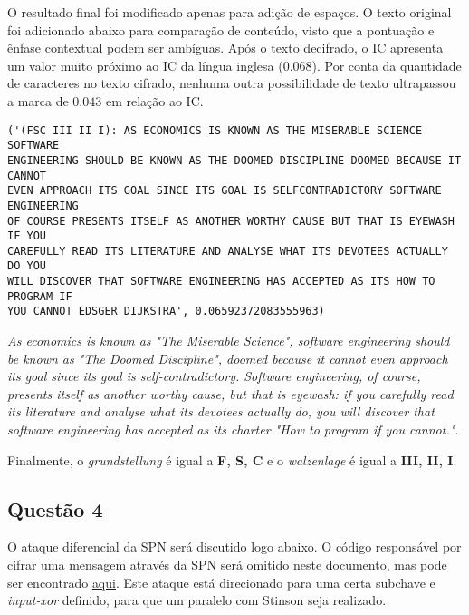 \documentclass{article}
\begin{document}
O resultado final foi modificado apenas para adição de espaços. O texto
original foi adicionado abaixo para comparação de conteúdo, visto que a
pontuação e ênfase contextual podem ser ambíguas. Após o texto decifrado, o IC
apresenta um valor muito próximo ao IC da língua inglesa ($0.068$). Por conta
da quantidade de caracteres no texto cifrado, nenhuma outra possibilidade de
texto ultrapassou a marca de $0.043$ em relação ao IC.

\begin{verbatim}
('(FSC III II I): AS ECONOMICS IS KNOWN AS THE MISERABLE SCIENCE SOFTWARE
ENGINEERING SHOULD BE KNOWN AS THE DOOMED DISCIPLINE DOOMED BECAUSE IT CANNOT
EVEN APPROACH ITS GOAL SINCE ITS GOAL IS SELFCONTRADICTORY SOFTWARE ENGINEERING
OF COURSE PRESENTS ITSELF AS ANOTHER WORTHY CAUSE BUT THAT IS EYEWASH IF YOU
CAREFULLY READ ITS LITERATURE AND ANALYSE WHAT ITS DEVOTEES ACTUALLY DO YOU
WILL DISCOVER THAT SOFTWARE ENGINEERING HAS ACCEPTED AS ITS HOW TO PROGRAM IF
YOU CANNOT EDSGER DIJKSTRA', 0.06592372083555963)
\end{verbatim}

\textit{As economics is known as "The Miserable Science", software engineering
should be known as "The Doomed Discipline", doomed because it cannot even
approach its goal since its goal is self-contradictory. Software engineering,
of course, presents itself as another worthy cause, but that is eyewash: if
you carefully read its literature and analyse what its devotees actually do,
you will discover that software engineering has accepted as its charter "How
to program if you cannot.".} \cite{dijkstra1989cruelty} \vspace{2mm}

Finalmente, o \textit{grundstellung} é igual a \textbf{F, S, C} e o
\textit{walzenlage} é igual a \textbf{III, II, I}.

\subsection*{Questão 4}

O ataque diferencial da SPN será discutido logo abaixo. O código responsável
por cifrar uma mensagem através da SPN será omitido neste documento, mas pode
ser encontrado \href{https://github.com/zambonin/UFSC-INE5451/blob/master/classical/spn.py}{aqui}.
Este ataque está direcionado para uma certa subchave e \textit{input-xor}
definido, para que um paralelo com Stinson
\cite[p. 94]{Stinson:2002:CTP:515609} seja realizado.
\end{document}
